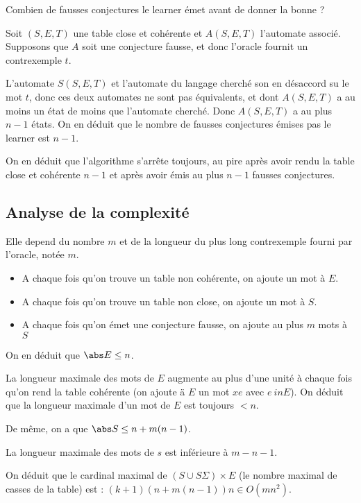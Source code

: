 Combien de fausses conjectures  le learner émet avant de donner la bonne ?

Soit $(S,E,T)$ une table close et cohérente et $A(S,E,T)$ l'automate associé.
Supposons que $A$ soit une conjecture fausse, et donc l'oracle fournit un contrexemple $t$.

L'automate $S(S,E,T)$ et l'automate du langage cherché son en désaccord su le mot $t$, donc ces deux automates
ne sont pas équivalents, et dont $A(S,E,T)$ a au moins un état de moins que l'automate cherché.
Donc $A(S,E,T)$ a au plus $n-1$ états. On en déduit que le nombre de fausses conjectures émises pas le learner est $n-1$.

On en déduit que l'algorithme s'arrête toujours, au pire après avoir rendu la table close et
cohérente $n-1$ et après avoir émis au plus $n-1$ fausses conjectures.


\subsection{Analyse de la complexité}

Elle depend du nombre $m$ et de la longueur du plus long contrexemple fourni par l'oracle, notée $m$.


\begin{itemize}
	\item A chaque fois qu'on trouve un table non cohérente, on ajoute un mot à $E$.
	\item A chaque fois qu'on trouve un table non close, on ajoute un mot à $S$.
	\item A chaque fois qu'on émet une conjecture fausse, on ajoute au plus $m$ mots à $S$
\end{itemize}

On en déduit que $\abs E \leq n$.

La longueur maximale des mots de $E$ augmente au plus d'une unité à chaque fois qu'on rend la table cohérente
(on ajoute ä $E$ un mot $xe$ avec $e\ in E$). On déduit que la longueur maximale d'un mot de $E$ est toujours $<n$.

De même, on a que  $\abs S \leq n + m(n-1)$. %

La longueur maximale des mots de $s$ est inférieure à $m - n -1$.


On déduit que le cardinal maximal de $(S \cup S \Sigma) \times E$ (le nombre maximal de casses de la table) est : $(k+1)(n+m(n-1))n \in O(mn^2)$.


